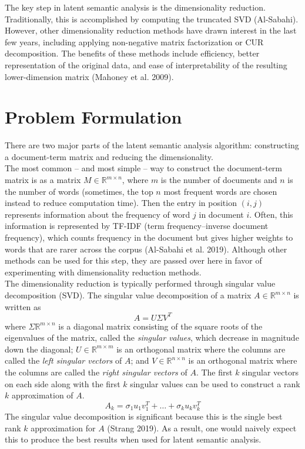 \documentclass{article}
\begin{document}
The key step in latent semantic analysis is the dimensionality reduction. Traditionally, this is accomplished by computing the truncated SVD (Al-Sabahi).  However, other dimensionality reduction methods have drawn interest in the last few years, including applying non-negative matrix factorization or CUR decomposition. The benefits of these methods include efficiency, better representation of the original data, and ease of interpretability of the resulting lower-dimension matrix (Mahoney et al. 2009).

\section{Problem Formulation}
There are two major parts of the latent semantic analysis algorithm: constructing a document-term matrix and reducing the dimensionality. \\

The most common -- and most simple -- way to construct the document-term matrix is as a matrix  $M \in \mathbb{R}^{m \times n}$, where $m$ is the number of documents and $n$ is the number of words (sometimes, the top $n$ most frequent words are chosen instead to reduce computation time). Then the entry in position $(i, j)$ represents information about the frequency of word $j$ in document $i$. Often, this information is represented by TF-IDF (term frequency–inverse document frequency), which counts frequency in the document but gives higher weights to words that are rarer across the corpus (Al-Sabahi et al. 2019). Although other methods can be used for this step, they are passed over here in favor of experimenting with dimensionality reduction methods. \\

The dimensionality reduction is typically performed through singular value decomposition (SVD). The singular value decomposition of a matrix $A \in \mathbb{R}^{m \times n}$ is written as
$$A = U \Sigma V^{T}$$
where $\Sigma \mathbb{R}^{m \times n} $ is a diagonal matrix consisting of the square roots of the eigenvalues of the matrix, called the \textit{singular values}, which decrease in magnitude down the diagonal; $U \in \mathbb{R}^{m \times m}$ is an orthogonal matrix where the columns are called the \textit{left singular vectors} of $A$; and $V \in \mathbb{R}^{n \times n}$ is an orthogonal matrix where the columns are called the \textit{right singular vectors} of $A$. The first $k$ singular vectors on each side along with the first $k$ singular values can be used to construct a rank $k$ approximation of $A$.
$$A_k = \sigma_1 u_1 v_1^T + \ldots + \sigma_k u_k v_k^T$$
The singular value decomposition is significant because this is the single best rank $k$ approximation for $A$ (Strang 2019). As a result, one would naively expect this to produce the best results when used for latent semantic analysis. \\
\end{document}
